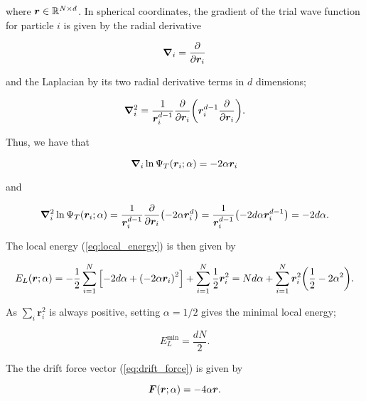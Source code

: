 where $\bm{r} \in \mathbb{R}^{N\times d}$. In spherical coordinates, the gradient of the trial wave function for particle $i$ is given by the radial derivative


\begin{equation*}
    \grad_i = \pdv{\bm{r}_i}
\end{equation*}

and the Laplacian by its two radial derivative terms in $d$ dimensions; 

\begin{equation*}
    \grad_i^2 = \frac{1}{\bm{r}_i^{d-1}} \pdv{\bm{r}_i} \qty(\bm{r}_i^{d-1} \pdv{\bm{r}_i}). 
\end{equation*} 

Thus, we have that 

\begin{equation*}
    \grad_i \ln \Psi_T \qty(\bm{r}_i; \alpha) = -2 \alpha \bm{r}_i 
\end{equation*} 

and 

\begin{equation*}
    \grad_i^2 \ln \Psi_T \qty(\bm{r}_i; \alpha) = \frac{1}{\bm{r}_i^{d-1}} \pdv{\bm{r}_i} \qty(-2 \alpha \bm{r}_i^d) = \frac{1}{\bm{r}_i^{d-1}}  \qty(-2 d \alpha \bm{r}_i^{d-1}) = -2 d \alpha .
\end{equation*}

The local energy (\autoref{eq:local_energy}) is then given by 

\begin{equation}
    E_L  \qty(\bm{r}; \alpha) = -\frac{1}{2} \sum_{i=1}^N \qty[- 2d \alpha + \qty(-2\alpha \bm{r}_i)^2] + \sum_{i=1}^N \frac{1}{2} \bm{r}_i^2 = Nd \alpha + \sum_{i=1}^N \bm{r}_i^2 \qty(\frac{1}{2} - 2 \alpha^2).
\end{equation}

As $\sum_i \bm{r}_i^2$ is always positive, setting $\alpha = 1 /2$ gives the minimal local energy;

\begin{equation}
    E_L^\mathrm{min} = \frac{d N}{2}.
\end{equation}

The the drift force vector (\autoref{eq:drift_force}) is given by 

\begin{equation}
    \bm{F}\qty(\bm{r}; \alpha) = - 4 \alpha \bm{r}.
\end{equation}



